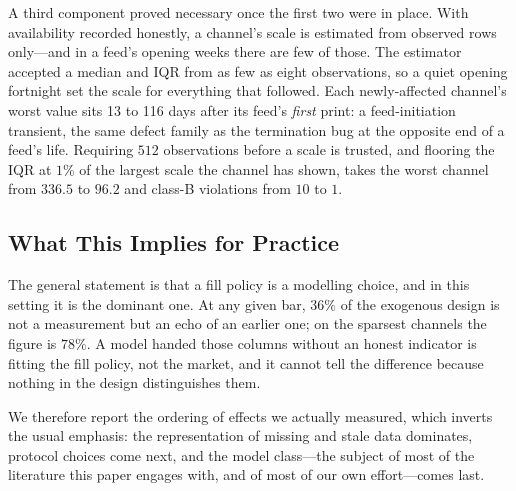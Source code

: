 A third component proved necessary once the first two were in place. With
availability recorded honestly, a channel's scale is estimated from observed
rows only---and in a feed's opening weeks there are few of those. The estimator
accepted a median and IQR from as few as eight observations, so a quiet opening
fortnight set the scale for everything that followed. Each newly-affected
channel's worst value sits 13 to 116 days after its feed's \emph{first} print:
a feed-initiation transient, the same defect family as the termination bug at
the opposite end of a feed's life. Requiring $512$ observations before a scale
is trusted, and flooring the IQR at $1\%$ of the largest scale the channel has
shown, takes the worst channel from $336.5$ to $96.2$ and class-B violations
from $10$ to $1$.

\subsection{What This Implies for Practice}

The general statement is that a fill policy is a modelling choice, and in this
setting it is the dominant one. At any given bar, $36\%$ of the exogenous
design is not a measurement but an echo of an earlier one; on the sparsest
channels the figure is $78\%$. A model handed those columns without an honest
indicator is fitting the fill policy, not the market, and it cannot tell the
difference because nothing in the design distinguishes them.

We therefore report the ordering of effects we actually measured, which inverts
the usual emphasis: the representation of missing and stale data dominates,
protocol choices come next, and the model class---the subject of most of the
literature this paper engages with, and of most of our own effort---comes last.
